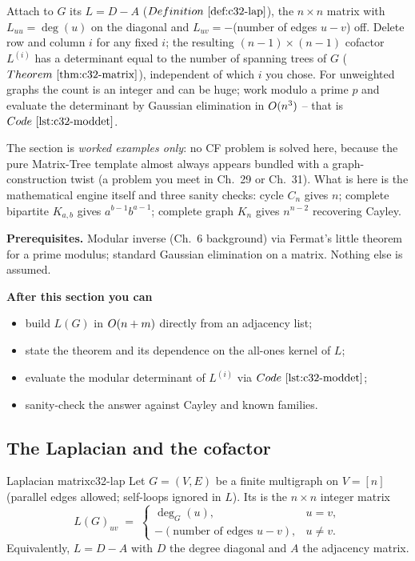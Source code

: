 \begin{topicintro}
Attach to \(G\) its  \(L = D - A\) (\(\defref{c32-lap}\)), the
\(n\times n\) matrix with \(L_{uu}=\deg(u)\) on the diagonal and \(L_{uv} =
-\)(number of edges \(u\!-\!v\)) off.  Delete row and column \(i\) for any
fixed \(i\); the resulting \((n-1)\times(n-1)\) cofactor \(L^{(i)}\) has a
determinant equal to the number of spanning trees of \(G\)
(\(\thmref{c32-matrix}\)), independent of which \(i\) you chose.  For
unweighted graphs the count is an integer and can be huge; work modulo a
prime \(p\) and evaluate the determinant by Gaussian elimination in
\(O(n^3)\) -- that is \(\coderef{c32-moddet}\).

The section is \emph{worked examples only}: no CF problem is solved here,
because the pure Matrix-Tree template almost always appears bundled with a
graph-construction twist (a problem you meet in Ch.~29 or Ch.~31).  What is
here is the mathematical engine itself and three sanity checks: cycle \(C_n\)
gives \(n\); complete bipartite \(K_{a,b}\) gives \(a^{b-1}b^{a-1}\);
complete graph \(K_n\) gives \(n^{n-2}\) recovering Cayley.

\textbf{Prerequisites.} Modular inverse (Ch.~6 background) via Fermat's little
theorem for a prime modulus; standard Gaussian elimination on a matrix.
Nothing else is assumed.

\textbf{After this section you can}
\begin{itemize}[nosep]
  \item build \(L(G)\) in \(O(n+m)\) directly from an adjacency list; \hfill{}
  \item state the theorem and its dependence on the all-ones kernel of \(L\); \hfill{}
  \item evaluate the modular determinant of \(L^{(i)}\) via \(\coderef{c32-moddet}\); \hfill{}
  \item sanity-check the answer against Cayley and known families. \hfill{}
\end{itemize}
\end{topicintro}

\subsection{The Laplacian and the cofactor}

\begin{definition}{Laplacian matrix}{c32-lap}
Let \(G=(V,E)\) be a finite multigraph on \(V=[n]\) (parallel edges allowed;
self-loops ignored in \(L\)).  Its  is the \(n\times n\)
integer matrix
\[
  L(G)_{uv} \;=\; \begin{cases}
    \deg_G(u), & u=v,\\
    -(\text{number of edges }u\!-\!v), & u\ne v.
  \end{cases}
\]
Equivalently, \(L = D - A\) with \(D\) the degree diagonal and \(A\) the
adjacency matrix.
\end{definition}

